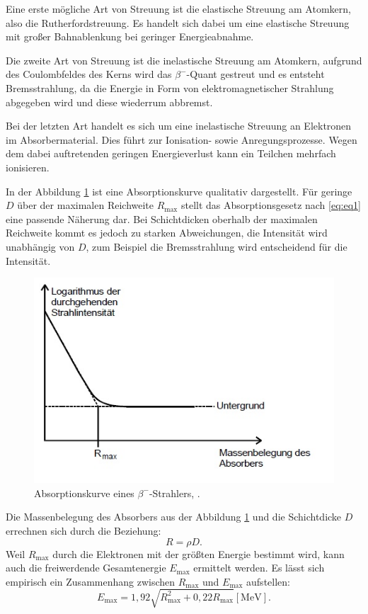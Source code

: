 Eine erste mögliche Art von Streuung ist die elastische Streuung am Atomkern, also die Rutherfordstreuung. Es handelt sich dabei um eine elastische Streuung mit großer Bahnablenkung bei geringer Energieabnahme.

Die zweite Art von Streuung ist die inelastische Streuung am Atomkern, aufgrund des Coulombfeldes des Kerns wird das $\beta^{-}$-Quant gestreut und es entsteht Bremsstrahlung, da die Energie in Form von elektromagnetischer Strahlung abgegeben wird und diese wiederrum abbremst.

Bei der letzten Art handelt es sich um eine inelastische Streuung an Elektronen im Absorbermaterial. Dies führt zur Ionisation- sowie Anregungsprozesse. Wegen dem dabei auftretenden geringen Energieverlust kann ein Teilchen mehrfach ionisieren.

In der Abbildung \ref{fig:absorptionskurve} ist eine Absorptionskurve qualitativ dargestellt. Für geringe $D$ über der maximalen Reichweite $R_\text{max}$ stellt das Absorptionsgesetz nach \ref{eq:eq1} eine passende Näherung dar. Bei Schichtdicken oberhalb der maximalen Reichweite kommt es jedoch zu starken Abweichungen, die Intensität wird unabhängig von $D$, zum Beispiel die Bremsstrahlung wird entscheidend für die Intensität.
\begin{figure}[h!]
	\centering
	\includegraphics[width=0.7\linewidth]{Absorptionskurve.jpg}
	\caption{Absorptionskurve eines $\beta^{-}$-Strahlers, \cite[12]{anleitung704}.}
	\label{fig:absorptionskurve}
\end{figure}
Die Massenbelegung des Absorbers aus der Abbildung \ref{fig:absorptionskurve} und die Schichtdicke $D$ errechnen sich durch die Beziehung:
\begin{equation*}
R = \rho D.
\end{equation*}
Weil $R_\text{max}$ durch die Elektronen mit der größten Energie bestimmt wird, kann auch die freiwerdende Gesamtenergie $E_\text{max}$ ermittelt werden. Es lässt sich empirisch ein Zusammenhang zwischen $R_\text{max}$ und $E_\text{max}$ aufstellen:
\begin{equation}
E_\text{max} = 1,92\sqrt{R_\text{max}^{2}+0,22R_\text{max}}\left[\si{\mega\electronvolt}\right].
\label{eq:gesamtenergie}
\end{equation}
